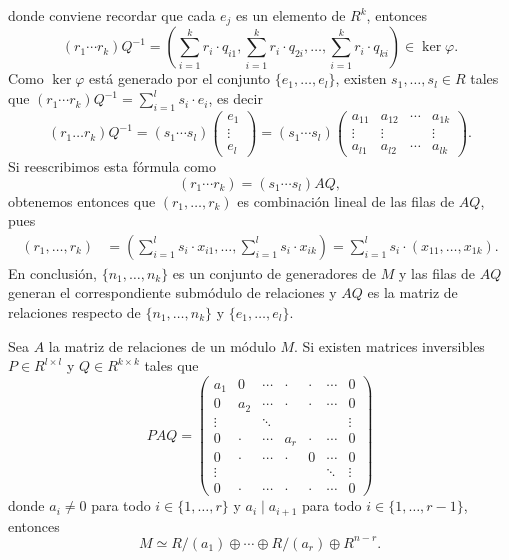 donde conviene recordar que cada $e_j$ es un elemento de $R^k$, entonces 
\[
(r_1\cdots r_k)Q^{-1} = \left(\sum_{i=1}^k r_i\cdot q_{i1},\sum_{i=1}^k r_i\cdot q_{2i},\dots,\sum_{i=1}^k r_i\cdot q_{ki}\right)\in \ker\varphi.
\]
Como $\ker\varphi$ está generado por el conjunto $\{e_1,\dots,e_l\}$, existen  
$s_1,\dots,s_l\in R$ tales que $(r_1\cdots r_k)Q^{-1}=\sum_{i=1}^l s_i\cdot e_i$, es decir  
\[
(r_1\dots r_k)Q^{-1}=(s_1\cdots s_l)\begin{pmatrix}e_1\\\vdots\\ e_l\end{pmatrix}
=(s_1\cdots s_l)\begin{pmatrix}
a_{11} & a_{12} & \cdots & a_{1k}\\
\vdots & \vdots & & \vdots\\
a_{l1} & a_{l2} & \cdots & a_{lk}	
\end{pmatrix}
.
\]
Si reescribimos esta fórmula como
\[
(r_1\cdots r_k)=(s_1\cdots s_l)AQ,
\]
obtenemos entonces que $(r_1,\dots,r_k)$ es combinación lineal de las filas de $AQ$, pues
\begin{align*}
(r_1,\dots,r_k)&=\left(\sum_{i=1}^l s_i\cdot x_{i1},\dots,\sum_{i=1}^l s_i\cdot x_{ik}\right)
=\sum_{i=1}^l s_i\cdot (x_{11},\dots,x_{1k}).
\end{align*}
En conclusión, $\{n_1,\dots,n_k\}$ es un conjunto de generadores de $M$ y las filas de $AQ$ generan el correspondiente
submódulo de relaciones y $AQ$ es la matriz de relaciones respecto de $\{n_1,\dots,n_k\}$ y $\{e_1,\dots,e_l\}$. 

\begin{proposition}
Sea $A$ la matriz de relaciones de un módulo $M$. 
Si existen matrices inversibles $P\in R^{l\times l}$ y $Q\in R^{k\times k}$ tales que
\[
PAQ=
\begin{pmatrix}
a_1 & 0 & \cdots & \cdot & \cdot & \cdots & 0\\
0 & a_2 & \cdots & \cdot & \cdot & \cdots & 0\\
\vdots && \ddots &  & & & \vdots\\	
0 & \cdot & \cdots & a_r & \cdot & \cdots & 0\\	
0 & \cdot & \cdots & \cdot & 0 & \cdots & 0\\	
\vdots &&&&&\ddots &\vdots\\
0 & \cdot & \cdots & \cdot & \cdot & \cdots & 0
\end{pmatrix}
\]
donde $a_i\ne0$ para todo $i\in\{1,\dots,r\}$ y $a_i\mid a_{i+1}$ para todo $i\in\{1,\dots,r-1\}$,  
entonces 
\[
M\simeq R/(a_1)\oplus\cdots\oplus R/(a_r)\oplus R^{n-r}.
\]
\end{proposition}

